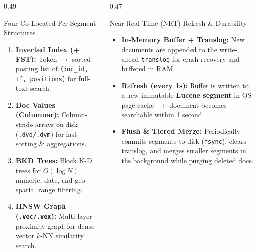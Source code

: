 \documentclass[aspectratio=169]{beamer}
\begin{document}
\begin{frame}
\vspace{0.15cm}
\begin{columns}[T]
\begin{column}{0.49\textwidth}
\begin{block}{Four Co-Located Per-Segment Structures}
\scriptsize
\begin{enumerate}
    \item \textbf{Inverted Index (+ FST):} Token $\rightarrow$ sorted posting list of \texttt{(doc\_id, tf, positions)} for full-text search.
    \item \textbf{Doc Values (Columnar):} Column-stride arrays on disk (\texttt{.dvd/.dvm}) for fast sorting \& aggregations.
    \item \textbf{BKD Trees:} Block K-D trees for $O(\log N)$ numeric, date, and geo-spatial range filtering.
    \item \textbf{HNSW Graph (\texttt{.vec/.vex}):} Multi-layer proximity graph for dense vector $k$-NN similarity search.
\end{enumerate}
\end{block}
\end{column}
\begin{column}{0.47\textwidth}
\begin{block}{Near Real-Time (NRT) Refresh \& Durability}
\scriptsize
\begin{itemize}
    \item \textbf{In-Memory Buffer + Translog:} New documents are appended to the write-ahead \texttt{translog} for crash recovery and buffered in RAM.
    \item \textbf{Refresh (every 1s):} Buffer is written to a new immutable \textbf{Lucene segment} in OS page cache $\rightarrow$ document becomes searchable within 1 second.
    \item \textbf{Flush \& Tiered Merge:} Periodically commits segments to disk (\texttt{fsync}), clears translog, and merges smaller segments in the background while purging deleted docs.
\end{itemize}
\end{block}
\end{column}
\end{columns}
\end{frame}
\end{document}
